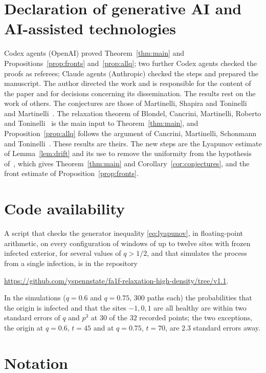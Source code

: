 \documentclass[11pt]{amsart}
\theoremstyle{remark}
\begin{document}
\section*{Declaration of generative AI and AI-assisted technologies}
Codex agents (OpenAI) proved Theorem~\ref{thm:main} and Propositions~\ref{prop:fronts} and~\ref{prop:allq}; two further
Codex agents checked the proofs as referees; Claude agents (Anthropic) checked the steps and prepared the manuscript.
The author directed the work and is responsible for the content of the paper and for decisions concerning its
dissemination. The results rest on the work of others. The conjectures are those of Martinelli, Shapira and
Toninelli~\cite{MST25} and Martinelli~\cite{Mar26}. The relaxation theorem of Blondel, Cancrini, Martinelli, Roberto
and Toninelli~\cite[Theorem~2.1]{BCMRT13} is the main input to Theorem~\ref{thm:main}, and
Proposition~\ref{prop:allq} follows the argument of Cancrini, Martinelli, Schonmann and Toninelli~\cite{CMST10}.
These results are theirs. The new steps are the Lyapunov estimate of Lemma~\ref{lem:drift} and its use to remove
the uniformity from the hypothesis of~\cite{BCMRT13}, which gives Theorem~\ref{thm:main} and
Corollary~\ref{cor:conjectures}, and the front estimate of Proposition~\ref{prop:fronts}.

\section*{Code availability}
A script that checks the generator inequality \eqref{eq:lyapunov}, in floating-point arithmetic, on every configuration of
windows of up to twelve sites with frozen infected exterior, for several values of $q>1/2$, and that simulates the process from a single
infection, is in the repository
\begin{center}\url{https://github.com/yspennstate/fa1f-relaxation-high-density/tree/v1.1}.\end{center}
In the simulations ($q=0.6$ and $q=0.75$, $300$ paths each) the probabilities that the origin is infected and that
the sites $-1,0,1$ are all healthy are within two standard errors of $q$ and $p^3$ at $30$ of the $32$ recorded points; the two
exceptions, the origin at $q=0.6$, $t=45$ and at $q=0.75$, $t=70$, are $2.3$ standard errors away.

\appendix
\section{Notation}\label{app:notation}
\end{document}
